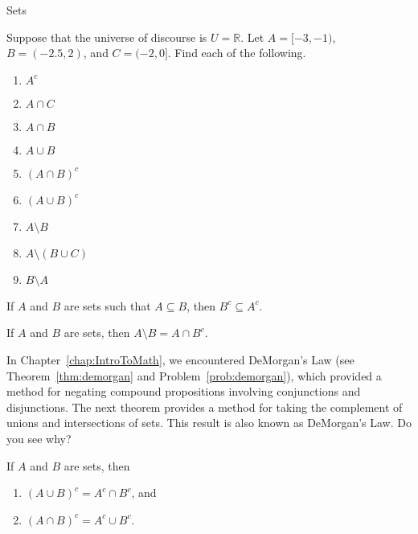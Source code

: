 \begin{section}{Sets}
\begin{problem}
Suppose that the universe of discourse is $U=\mathbb{R}$.  Let $A=[-3,-1)$, $B=(-2.5,2)$, and $C=(-2,0]$.  Find each of the following.
\begin{multicols}{2}
\begin{enumerate}[label=\textrm{(\alph*)}]
\item $A^c$
\item $A \cap C$
\item $A \cap B$
\item $A \cup B$
\item $(A\cap B)^c$
\item $(A\cup B)^c$
\item $A \setminus B$
\item $A\setminus (B \cup C)$
\item $B \setminus A$
\end{enumerate}
\end{multicols}
\end{problem}

\begin{theorem}
If $A$ and $B$ are sets such that $A \subseteq B$, then $B^c \subseteq A^c$.
\end{theorem}

\begin{theorem}
If $A$ and $B$ are sets, then $A\setminus B = A \cap B^c$.
\end{theorem}


In Chapter~\ref{chap:IntroToMath}, we encountered DeMorgan's Law (see Theorem~\ref{thm:demorgan} and Problem~\ref{prob:demorgan}), which provided a method for negating compound propositions involving conjunctions and disjunctions.  The next theorem provides a method for taking the complement of unions and intersections of sets.  This result is also known as DeMorgan's Law. Do you see why?

\begin{theorem}
If $A$ and $B$ are sets, then
\begin{enumerate}[label=\textrm{(\alph*)}]
\item $(A \cup B)^c = A^c \cap B^c$, and
\item $(A \cap B)^c = A^c \cup B^c$.
\end{enumerate}
\end{theorem}


\end{section}
